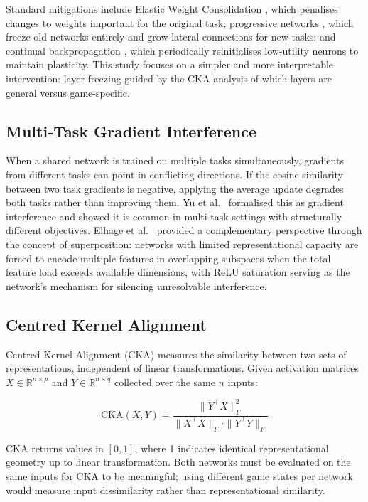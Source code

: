 \documentclass[a4paper]{article}
\begin{document}
Standard mitigations include Elastic Weight Consolidation \cite{kirkpatrick2017overcoming},
which penalises changes to weights important for the original task; progressive networks
\cite{rusu2016progressive}, which freeze old networks entirely and grow lateral connections
for new tasks; and continual backpropagation \cite{elsayed2024continual,dohare2024loss},
which periodically reinitialises low-utility neurons to maintain plasticity. This study
focuses on a simpler and more interpretable intervention: layer freezing guided by the CKA
analysis of which layers are general versus game-specific.

\subsection{Multi-Task Gradient Interference}

When a shared network is trained on multiple tasks simultaneously, gradients from different
tasks can point in conflicting directions. If the cosine similarity between two task
gradients is negative, applying the average update degrades both tasks rather than
improving them. Yu et al.\ \cite{yu2020pcgrad} formalised this as gradient interference
and showed it is common in multi-task settings with structurally different objectives.
Elhage et al.\ \cite{elhage2022superposition} provided a complementary perspective through
the concept of superposition: networks with limited representational capacity are forced to
encode multiple features in overlapping subspaces when the total feature load exceeds
available dimensions, with ReLU saturation serving as the network's mechanism for silencing
unresolvable interference.

\subsection{Centred Kernel Alignment}

Centred Kernel Alignment (CKA) \cite{kornblith2019similarity} measures the similarity
between two sets of representations, independent of linear transformations. Given activation
matrices $X \in \mathbb{R}^{n \times p}$ and $Y \in \mathbb{R}^{n \times q}$ collected
over the same $n$ inputs:

\begin{equation}
    \text{CKA}(X, Y) = \frac{\|Y^{\top}X\|_F^2}{\|X^{\top}X\|_F \cdot \|Y^{\top}Y\|_F}
\end{equation}

CKA returns values in $[0, 1]$, where 1 indicates identical representational geometry up
to linear transformation. Both networks must be evaluated on the same inputs for CKA to be
meaningful; using different game states per network would measure input dissimilarity rather
than representational similarity.
\end{document}
